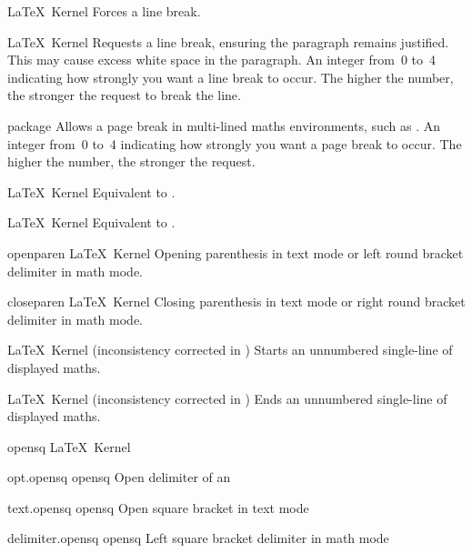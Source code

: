 %
 {}%
 {\LaTeX\ Kernel}%
 {Forces a line break.}%
 {}

%
 {}%
 {\LaTeX\ Kernel}%
 {Requests a line break, ensuring the paragraph remains justified.
  This may cause excess white space in the paragraph.}%
 {%
   \BeginArgList
     An integer from~0 to~4 indicating how strongly
    you want a line break to occur. The higher the number, the
    stronger the request to break the line.
   \EndArgList
 }

%
 {}%
 { package}%
 {Allows a page break in multi-lined maths environments, such as
  .}%
 {%
   \BeginArgList
     An integer from~0 to~4 indicating how strongly
    you want a page break to occur. The higher the number, the
    stronger the request.
   \EndArgList
 }

%
 {}%
 {\LaTeX\ Kernel}%
 {Equivalent to .}%
 {}

%
 {}%
 {\LaTeX\ Kernel}%
 {Equivalent to .}%
 {}

 {openparen}
 {\openparensym}
 {}
 {\LaTeX\ Kernel}
 {%
   Opening parenthesis in text mode or left round bracket
   delimiter in math mode.%
 }
 {}

 {closeparen}
 {\closeparensym}
 {}
 {\LaTeX\ Kernel}
 {%
   Closing parenthesis in text mode or right round bracket
   delimiter in math mode.%
 }
 {}

%
 {}%
 {\LaTeX\ Kernel (inconsistency corrected in )}%
 {Starts an unnumbered single-line of displayed maths.}%
 {}

%
 {}%
 {\LaTeX\ Kernel (inconsistency corrected in )}%
 {Ends an unnumbered single-line of displayed maths.}%
 {}

 {opensq}
 {\opensqsym}
 {}
 {\LaTeX\ Kernel}
 {\nopostdesc}
 {}

 {opt.opensq}
 {opensq}
 {\opensqsym}
 {Open delimiter of an }

 {text.opensq}
 {opensq}
 {\opensqsym}
 {Open square bracket in text mode}

 {delimiter.opensq}
 {opensq}
 {\opensqsym}
 {Left square bracket delimiter in math mode}

